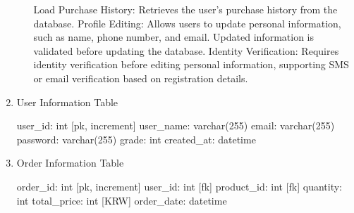 \documentclass[conference]{IEEEtran}
\begin{document}
\begin{enumerate}
\begin{itemize}
Load Purchase History: Retrieves the user’s purchase history from the database. \newline\hspace*{1.2ex}
Profile Editing: Allows users to update personal information, such as name, phone number, and email. Updated information is validated before updating the database. \newline\hspace*{1.2ex}
Identity Verification: Requires identity verification before editing personal information, supporting SMS or email verification based on registration details.

\end{itemize}

\item User Information Table

user\_id: int [pk, increment] \newline\hspace*{1.2ex}
user\_name: varchar(255) \newline\hspace*{1.2ex}
email: varchar(255) \newline\hspace*{1.2ex}
password: varchar(255) \newline\hspace*{1.2ex}
grade: int \newline\hspace*{1.2ex}
created\_at: datetime

\hspace{0.5em}{\scriptsize Table attribute can be changed in development.}

\item Order Information Table

order\_id: int [pk, increment] \newline\hspace*{1.2ex}
user\_id: int [fk] \newline\hspace*{1.2ex}
product\_id: int [fk] \newline\hspace*{1.2ex}
quantity: int \newline\hspace*{1.2ex}
total\_price: int [KRW] \newline\hspace*{1.2ex}
order\_date: datetime

\hspace{0.5em}{\scriptsize Table attribute can be changed in development.}

\end{enumerate}
\end{document}
